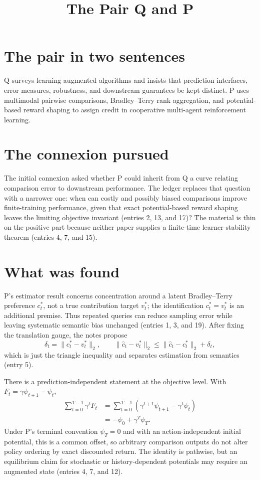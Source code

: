 \documentclass{article}
\title{The Pair Q and P}
\author{}
\date{}
\begin{document}
\maketitle

\section*{The pair in two sentences}
Q surveys learning-augmented algorithms and insists that prediction interfaces, error measures, robustness, and downstream guarantees be kept distinct. P uses multimodal pairwise comparisons, Bradley--Terry rank aggregation, and potential-based reward shaping to assign credit in cooperative multi-agent reinforcement learning.

\section*{The connexion pursued}
The initial connexion asked whether P could inherit from Q a curve relating comparison error to downstream performance.  The ledger replaces that question with a narrower one: when can costly and possibly biased comparisons improve finite-training performance, given that exact potential-based reward shaping leaves the limiting objective invariant (entries 2, 13, and 17)?  The material is thin on the positive part because neither paper supplies a finite-time learner-stability theorem (entries 4, 7, and 15).

\section*{What was found}
P's estimator result concerns concentration around a latent Bradley--Terry preference $c_t^*$, not a true contribution target $v_t^*$; the identification $c_t^*=v_t^*$ is an additional premise.  Thus repeated queries can reduce sampling error while leaving systematic semantic bias unchanged (entries 1, 3, and 19).  After fixing the translation gauge, the notes propose
\[
 \delta_t=\lVert c_t^*-v_t^*\rVert_2,
 \qquad
 \lVert \widehat c_t-v_t^*\rVert_2
 \leq \lVert \widehat c_t-c_t^*\rVert_2+\delta_t,
\]
which is just the triangle inequality and separates estimation from semantics (entry 5).

There is a prediction-independent statement at the objective level.  With
$F_t=\gamma\psi_{t+1}-\psi_t$,
\begin{align*}
 \sum_{t=0}^{T-1}\gamma^tF_t
 &=\sum_{t=0}^{T-1}
   \left(\gamma^{t+1}\psi_{t+1}-\gamma^t\psi_t\right)\\
 &=-\psi_0+\gamma^T\psi_T.
\end{align*}
Under P's terminal convention $\psi_T=0$ and with an action-independent initial potential, this is a common offset, so arbitrary comparison outputs do not alter policy ordering by exact discounted return.  The identity is pathwise, but an equilibrium claim for stochastic or history-dependent potentials may require an augmented state (entries 4, 7, and 12).
\end{document}
